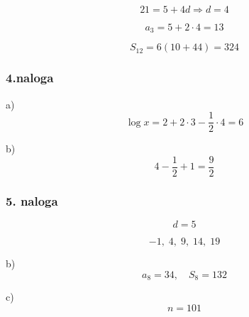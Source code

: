 \documentclass[a4paper,12pt]{letter}
\begin{document}
\[
21=5+4d \Rightarrow d=4
\]

\[
a_3=5+2\cdot4=13
\]

\[
S_{12}=6(10+44)=324
\]


\subsubsection{4.naloga}

a)
\[
\log x=2+2\cdot3-\frac{1}{2}\cdot4=6
\]

b)
\[
4-\frac12+1=\frac{9}{2}
\]


\subsubsection{5. naloga}

\[
d=5
\]

\[
-1,\;4,\;9,\;14,\;19
\]

b)
\[
a_8=34,\quad S_8=132
\]

c)
\[
n=101
\]

\end{document}
